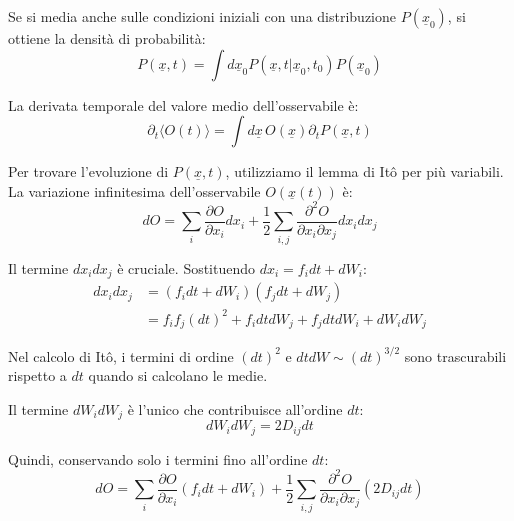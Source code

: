 Se si media anche sulle condizioni iniziali con una distribuzione $P(\underline{x}_0)$, si ottiene la densità di probabilità:
\begin{equation} 
P(\underline{x},t) = \int d\underline{x}_0 P(\underline{x}, t | \underline{x}_0, t_0) P(\underline{x}_0) 
\end{equation}

La derivata temporale del valore medio dell'osservabile è:
\begin{equation}
\partial_t \langle O(t) \rangle = \int d\underline{x} \, O(\underline{x}) \partial_t P(\underline{x}, t)
\label{eq:derivata_media_O}
\end{equation}

Per trovare l'evoluzione di $P(\underline{x},t)$, utilizziamo il lemma di Itô per più variabili. La variazione infinitesima dell'osservabile $O(\underline{x}(t))$ è:
\begin{equation}
dO = \sum_i \frac{\partial O}{\partial x_i} dx_i + \frac{1}{2} \sum_{i,j} \frac{\partial^2 O}{\partial x_i \partial x_j} dx_i dx_j
\end{equation}

Il termine $dx_i dx_j$ è cruciale. Sostituendo $dx_i = f_i dt + dW_i$:
\begin{align}
dx_i dx_j &= (f_i dt + dW_i)(f_j dt + dW_j) \nonumber \\ 
&= f_i f_j (dt)^2 + f_i dt dW_j + f_j dt dW_i + dW_i dW_j
\end{align}

\begin{tcolorbox}[
    colback=colorD!5,      
    colframe=colorD,       
    title={Attenzione},
    fonttitle=\bfseries\sffamily,
    arc=3mm,               
    boxrule=1.2pt,         
    halign title=flush left
]
Nel calcolo di Itô, i termini di ordine $(dt)^2$ e $dt dW \sim (dt)^{3/2}$ sono trascurabili rispetto a $dt$ quando si calcolano le medie.

\end{tcolorbox}
Il termine $dW_i dW_j$ è l'unico che contribuisce all'ordine $dt$: 
\begin{equation*}
dW_i dW_j = 2D_{ij} dt
\end{equation*}

Quindi, conservando solo i termini fino all'ordine $dt$:
\begin{equation}
dO = \sum_i \frac{\partial O}{\partial x_i} (f_i dt + dW_i) + \frac{1}{2} \sum_{i,j} \frac{\partial^2 O}{\partial x_i \partial x_j} (2D_{ij} dt)
\end{equation}


